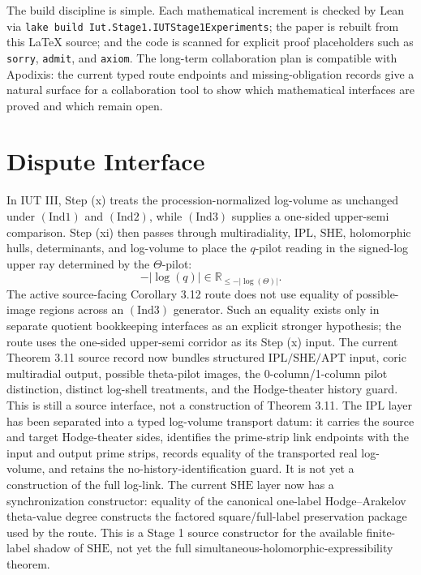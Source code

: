 \documentclass[11pt]{article}
\newcommand{\IUT}{IUT}
\newcommand{\Lean}{Lean}
\newcommand{\R}{\mathbb{R}}
\newcommand{\Ind}{\ensuremath{\mathrm{Ind}}}
\newcommand{\SHE}{\ensuremath{\mathrm{SHE}}}
\newcommand{\IPL}{\ensuremath{\mathrm{IPL}}}
\newcommand{\APT}{\ensuremath{\mathrm{APT}}}
\theoremstyle{plain}
\theoremstyle{definition}
\theoremstyle{remark}
\begin{document}
The build discipline is simple.  Each mathematical increment is checked by
\Lean{} via \texttt{lake build Iut.Stage1.IUTStage1Experiments}; the paper is
rebuilt from this LaTeX source; and the code is scanned for explicit proof
placeholders such as \texttt{sorry}, \texttt{admit}, and \texttt{axiom}.  The
long-term collaboration plan is compatible with Apodixis: the current typed
route endpoints and missing-obligation records give a natural surface for a
collaboration tool to show which mathematical interfaces are proved and which
remain open.

\section{Dispute Interface}

In \IUT{} III, Step (x) treats the procession-normalized log-volume as
unchanged under \((\Ind1)\) and \((\Ind2)\), while \((\Ind3)\) supplies a
one-sided upper-semi comparison.  Step (xi) then passes through multiradiality,
\(\IPL\), \(\SHE\), holomorphic hulls, determinants, and log-volume to place
the \(q\)-pilot reading in the signed-log upper ray determined by the
\(\Theta\)-pilot:
\[
  -|\log(q)|\in\R_{\le -|\log(\Theta)|}.
\]
The active source-facing Corollary 3.12 route does not use equality of
possible-image regions across an \((\Ind3)\) generator.  Such an equality exists
only in separate quotient bookkeeping interfaces as an explicit stronger
hypothesis; the route uses the one-sided upper-semi corridor as its Step (x)
input.
The current Theorem 3.11 source record now bundles structured
\(\IPL/\SHE/\APT\) input, coric multiradial output, possible theta-pilot images,
the 0-column/1-column pilot distinction, distinct log-shell treatments, and the
Hodge-theater history guard.  This is still a source interface, not a
construction of Theorem 3.11.
The \(\IPL\) layer has been separated into a typed log-volume transport datum:
it carries the source and target Hodge-theater sides, identifies the prime-strip
link endpoints with the input and output prime strips, records equality of the
transported real log-volume, and retains the no-history-identification guard.
It is not yet a construction of the full log-link.
The current \(\SHE\) layer now has a synchronization constructor: equality of
the canonical one-label Hodge--Arakelov theta-value degree constructs the
factored square/full-label preservation package used by the route.  This is a
Stage 1 source constructor for the available finite-label shadow of \(\SHE\),
not yet the full simultaneous-holomorphic-expressibility theorem.
\end{document}
